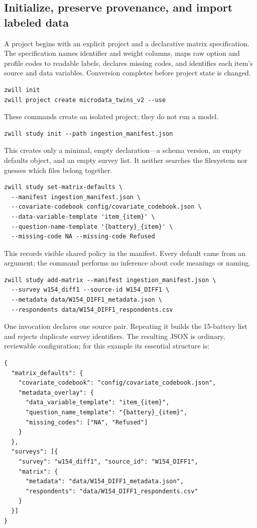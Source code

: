 \documentclass[11pt]{article}
\begin{document}
\subsection{Initialize, preserve provenance, and import labeled data}
A project begins with an explicit project and a declarative matrix specification.
The specification names identifier and weight columns, maps raw option and
profile codes to readable labels, declares missing codes, and identifies each
item's source and data variables. Conversion completes before project state is
changed.

\begin{lstlisting}[style=shell]
zwill init
zwill project create microdata_twins_v2 --use
\end{lstlisting}
These commands create an isolated project; they do not run a model.

\begin{lstlisting}[style=shell]
zwill study init --path ingestion_manifest.json
\end{lstlisting}
This creates only a minimal, empty declaration---a schema version, an empty
defaults object, and an empty survey list. It neither searches the filesystem
nor guesses which files belong together.

\begin{lstlisting}[style=shell]
zwill study set-matrix-defaults \
  --manifest ingestion_manifest.json \
  --covariate-codebook config/covariate_codebook.json \
  --data-variable-template 'item_{item}' \
  --question-name-template '{battery}_{item}' \
  --missing-code NA --missing-code Refused
\end{lstlisting}
This records visible shared policy in the manifest. Every default came from an
argument; the command performs no inference about code meanings or naming.

\begin{lstlisting}[style=shell]
zwill study add-matrix --manifest ingestion_manifest.json \
  --survey w154_diff1 --source-id W154_DIFF1 \
  --metadata data/W154_DIFF1_metadata.json \
  --respondents data/W154_DIFF1_respondents.csv
\end{lstlisting}
One invocation declares one source pair. Repeating it builds the 15-battery
list and rejects duplicate survey identifiers. The resulting JSON is ordinary,
reviewable configuration; for this example its essential structure is:
\begin{lstlisting}[style=json]
{
  "matrix_defaults": {
    "covariate_codebook": "config/covariate_codebook.json",
    "metadata_overlay": {
      "data_variable_template": "item_{item}",
      "question_name_template": "{battery}_{item}",
      "missing_codes": ["NA", "Refused"]
    }
  },
  "surveys": [{
    "survey": "w154_diff1", "source_id": "W154_DIFF1",
    "matrix": {
      "metadata": "data/W154_DIFF1_metadata.json",
      "respondents": "data/W154_DIFF1_respondents.csv"
    }
  }]
}
\end{lstlisting}
\end{document}

